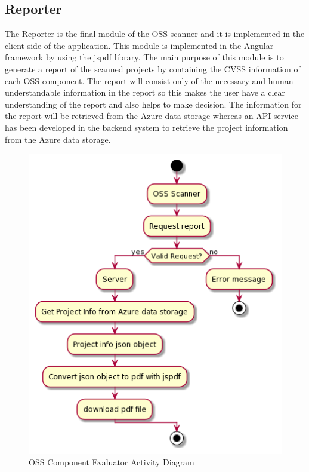 \subsection{Reporter}
The Reporter is the final module of the \acs{OSS} scanner and it is implemented in the client side of the application. This module is implemented in the Angular framework by using the jspdf library. The main purpose of this module is to generate a report of the scanned projects by containing the \acs{CVSS} information of each \acs{OSS} component. The report will consist only of the necessary and human understandable information in the report so this makes the user have a clear understanding of the report and also helps to make decision. The information for the report will be retrieved from the Azure data storage whereas an \acs{API} service has been developed in the backend system to retrieve the project information from the Azure data storage.
%
\begin{figure}[h!]
	\includegraphics[width=15cm]{includes/Reporter_Activity_Diagram.png}
	\centering
	\caption{\acs{OSS} Component Evaluator Activity Diagram}
	\label{fig:Reporter_Activity_Diagram}
\end{figure}   